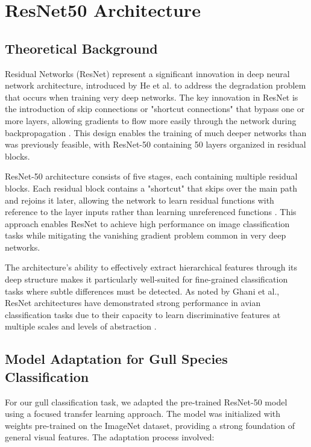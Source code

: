 \usepackage{natbib}%



\section{ResNet50 Architecture}

\subsection{Theoretical Background}

Residual Networks (ResNet) represent a significant innovation in deep neural network architecture, introduced by He et al. to address the degradation problem that occurs when training very deep networks. The key innovation in ResNet is the introduction of skip connections or "shortcut connections" that bypass one or more layers, allowing gradients to flow more easily through the network during backpropagation \citep{he2016deep}. This design enables the training of much deeper networks than was previously feasible, with ResNet-50 containing 50 layers organized in residual blocks.

ResNet-50 architecture consists of five stages, each containing multiple residual blocks. Each residual block contains a "shortcut" that skips over the main path and rejoins it later, allowing the network to learn residual functions with reference to the layer inputs rather than learning unreferenced functions \citep{he2016deep, he2016identity}. This approach enables ResNet to achieve high performance on image classification tasks while mitigating the vanishing gradient problem common in very deep networks.

The architecture's ability to effectively extract hierarchical features through its deep structure makes it particularly well-suited for fine-grained classification tasks where subtle differences must be detected. As noted by Ghani et al., ResNet architectures have demonstrated strong performance in avian classification tasks due to their capacity to learn discriminative features at multiple scales and levels of abstraction \citep{ghani2024comprehensive}.

\subsection{Model Adaptation for Gull Species Classification}

For our gull classification task, we adapted the pre-trained ResNet-50 model using a focused transfer learning approach. The model was initialized with weights pre-trained on the ImageNet dataset, providing a strong foundation of general visual features. The adaptation process involved:

